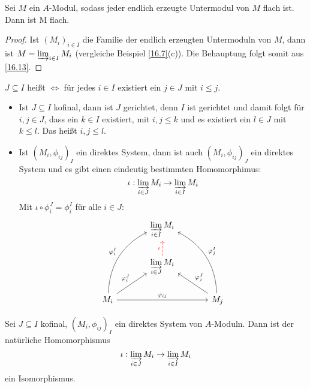 \begin{fo} \label{16.14}
	Sei $M$ ein $A$-Modul, sodass jeder endlich erzeugte Untermodul von $M$ flach ist. Dann ist M flach. 
\end{fo}
\begin{proof}
	Ist $(M_i)_{i \in I } $ die Familie der endlich erzeugten Untermoduln von $M$, dann ist $M = \varinjlim_{i\in I} M_i $ (vergleiche Beispiel \ref{16.7}(c)). Die Behauptung folgt somit aus \ref{16.13}.
\end{proof}
\begin{df}
	$J \subseteq I $ heißt  $\Leftrightarrow $ für jedes $ i \in I $ existiert ein $j \in J $ mit $ i \leq j$.
\end{df}
\begin{anm}
	\begin{itemize}
		\item Ist $J \subseteq I $ kofinal, dann ist $J $ gerichtet, denn  $I$ ist  gerichtet und damit folgt für  $i,j \in J  $, dass ein $k \in I$ existiert, mit $i,j \leq k $ und es existiert ein $l \in J $ mit $k \leq l $. Das heißt $i,j \leq l .$
		\item Ist $(M_i, \phi_{ij})_I $ ein direktes System, dann ist auch $(M_i, \phi_{ij})_J $ ein direktes System und es gibt einen eindeutig bestimmten Homomorphimus: $$ \iota: \varinjlim_{i\in J} M_i \to \varinjlim_{i\in I} M_i $$ 
		Mit $ \iota \circ \phi_i^J = \phi_i^I $ für alle $ i \in J $: 
		$$\begin{tikzcd}[column sep = large]
		& \varinjlim\limits_{i\in I} M_i & \\
		& \varinjlim\limits_{i\in J} M_i \arrow[dashed, red]{u}{\iota}& \\
		M_i \arrow{ur}{\phi_i^J} \arrow[bend left]{uur}{\phi_i^I} \arrow{rr}{\phi_{ij}} & & M_j \arrow[swap]{ul}{\phi_j^J} \arrow[bend right, swap]{uul}{\phi_j^I}
		\end{tikzcd}$$
	\end{itemize}
\end{anm}
\begin{bem} \label{16.16}
	Sei $ J \subseteq I $ kofinal, $(M_i, \phi_{ij})_I $ ein direktes System von $A$-Moduln. Dann ist der natürliche Homomorphismus $$ \iota: \varinjlim_{i\in J} M_i \to \varinjlim_{i\in I} M_i $$ ein Isomorphismus. 
\end{bem}
